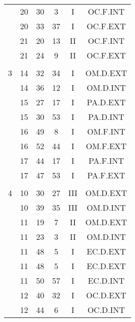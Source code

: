 \documentclass[12pt, a4paper]{article}
\begin{document}
\begin{multicols}{3}
{\begin{tabular}{c c c c c c}
	 	 	 	 & 20 & 30 & 3 & I & OC.F.INT\\%
	 	 	 	 & 20 & 33 & 37 & I & OC.F.EXT\\%
	 	 	 	 & 21 & 20 & 13 & II & OC.F.INT\\%
	 	 	 	 & 21 & 24 & 9 & II & OC.F.EXT\\%
	 	 	 	 & & & & & \\%
	 	 	 	3 & 14 & 32 & 34 & I & OM.D.EXT\\%
	 	 	 	 & 14 & 36 & 12 & I & OM.D.INT\\%
	 	 	 	 & 15 & 27 & 17 & I & PA.D.EXT\\%
	 	 	 	 & 15 & 30 & 53 & I & PA.D.INT\\%
	 	 	 	 & 16 & 49 & 8 & I & OM.F.INT\\%
	 	 	 	 & 16 & 52 & 44 & I & OM.F.EXT\\%
	 	 	 	 & 17 & 44 & 17 & I & PA.F.INT\\%
	 	 	 	 & 17 & 47 & 53 & I & PA.F.EXT\\%
	 	 	 	 & & & & & \\%
	 	 	 	4 & 10 & 30 & 27 & III & OM.D.EXT\\%
	 	 	 	 & 10 & 39 & 35 & III & OM.D.INT\\%
	 	 	 	 & 11 & 19 & 7 & II & OM.D.EXT\\%
	 	 	 	 & 11 & 23 & 3 & II & OM.D.INT\\%
	 	 	 	 & 11 & 48 & 5 & I & EC.D.EXT\\%
	 	 	 	 & 11 & 48 & 5 & I & EC.D.EXT\\%
	 	 	 	 & 11 & 50 & 57 & I & EC.D.INT\\%
	 	 	 	 & 12 & 40 & 32 & I & OC.D.EXT\\%
	 	 	 	 & 12 & 44 & 6 & I & OC.D.INT\\%

\end{tabular}}
\end{multicols}
\end{document}
